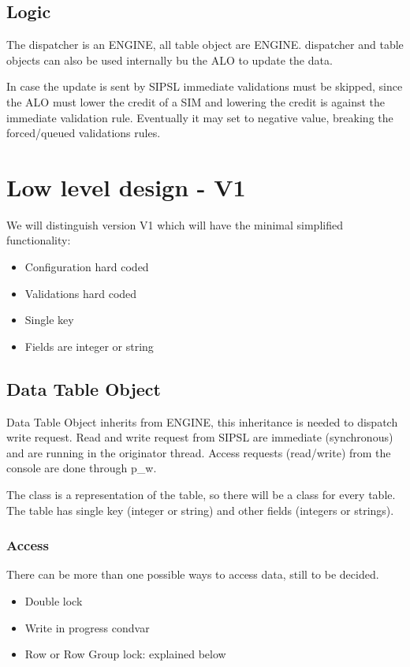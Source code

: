 \documentclass[a4paper]{article}
\begin{document}
\subsection{Logic}

The dispatcher is an ENGINE, all table object are ENGINE.
dispatcher and table objects can also be used internally bu the ALO to update
the data.


In case the update is sent by SIPSL immediate validations must be skipped,
since the ALO must lower the credit of a SIM and lowering the credit is against
the immediate validation rule.
Eventually it may set to negative value, breaking the forced/queued validations
rules.

\section{Low level design - V1}
We will distinguish version V1 which will have the minimal
simplified functionality: 
\begin{itemize}
	\item {Configuration hard coded}
	\item {Validations hard coded}
	\item {Single key}
	\item {Fields are integer or string}
\end{itemize}


\subsection{Data Table Object}
Data Table Object inherits from ENGINE, this inheritance is needed to dispatch
write request. Read and write request from SIPSL are immediate (synchronous) and
are running in the originator thread.
Access requests (read/write) from the console are done through p\_w.

The class is a representation of the table, so there will be a class for
every table.
The table has single key (integer or string) and other fields (integers or
strings).

\subsubsection{Access}
There can be more than one possible ways to access data, still to be decided.
\begin{itemize}
	\item {Double lock}
	\item {Write in progress condvar}
	\item {Row or Row Group lock: explained below}
\end{itemize}
\end{document}
